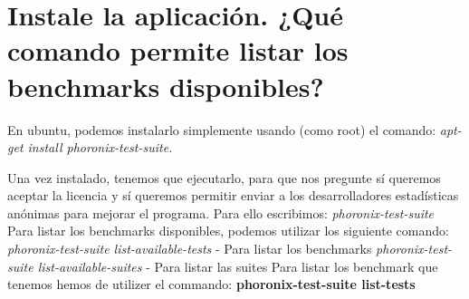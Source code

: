\maketitle %

\newpage %

\tableofcontents %

\listoffigures


\newpage




\section{Instale la  aplicación. ¿Qué comando permite listar los benchmarks disponibles?}

En ubuntu, podemos instalarlo simplemente usando (como root) el comando:
\textit{apt-get install phoronix-test-suite.}

Una vez instalado, tenemos que ejecutarlo, para que nos pregunte sí queremos aceptar la licencia y sí queremos permitir enviar a los desarrolladores estadísticas anónimas para mejorar el programa. Para ello escribimos:
\textit{ phoronix-test-suite}
Para listar los benchmarks disponibles, podemos utilizar los siguiente comando:
\textit{phoronix-test-suite list-available-tests} - Para listar los benchmarks
\textit{phoronix-test-suite list-available-suites} - Para listar las suites
Para listar los benchmark que tenemos hemos de utilizer el commando: 
\textbf{phoronix-test-suite list-tests}

